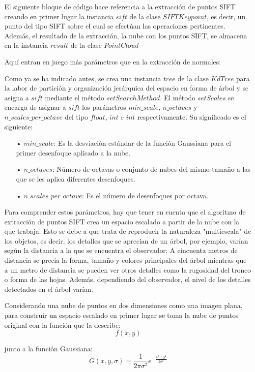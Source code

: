 El siguiente bloque de código hace referencia a la extracción de puntos SIFT creando en primer lugar la instancia $sift$ de la clase $SIFTKeypoint$, es decir, un punto del tipo SIFT sobre el cual se efectúan las operaciones pertinentes. Además, el resultado de la extracción, la nube con los puntos SIFT, se almacena en la instancia $result$ de la clase $PointCloud$

Aquí entran en juego más parámetros que en la extracción de normales:

Como ya se ha indicado antes, se crea una instancia $tree$ de la clase $KdTree$ para la labor de partición y organización jerárquica del espacio en forma de árbol y se asigna a $sift$ mediante el método $setSearchMethod$.
El método $setScales$ se encarga de asignar a $sift$ los parámetros $min\_scale$, $n\_octaves$ y $n\_scales\_per\_octave$ del tipo $float$, $int$ e $int$ respectivamente. Su significado es el siguiente:

\begin{itemize}
\item[•]$min\_scale$: Es la desviación estándar de la función Gaussiana para el primer desenfoque aplicado a la nube.
\item[•]$n\_octaves$: Número de octavas o conjunto de nubes del mismo tamaño a las que se les aplica diferentes desenfoques.
\item[•]$n\_scales\_per\_octave$: Es el número de desenfoques por octava.
\end{itemize}

Para comprender estos parámetros, hay que tener en cuenta que el algoritmo de extracción de puntos SIFT crea un espacio escalado a partir de la nube con la que trabaja. Esto se debe a que trata de reproducir la naturaleza "multiescala" de los objetos, es decir, los detalles que se aprecian de un árbol, por ejemplo, varían según la distancia a la que se encuentra el observador; A cincuenta metros de distancia se precia la forma, tamaño y colores principales del árbol mientras que a un metro de distancia se pueden ver otros detalles como la rugosidad del tronco o forma de las hojas. Además, dependiendo del observador, el nivel de los detalles detectados en el árbol varían.

Considerando una nube de puntos en dos dimensiones como una imagen plana, para construir un espacio escalado en primer lugar se toma la nube de puntos original con la función que la describe: 
$$f(x,y)$$ 

junto a la función Gaussiana:
$$G(x,y,\sigma)=\frac{1}{2\pi\sigma^2}e^{-\frac{x^2+y^2}{2\sigma^2}}$$

